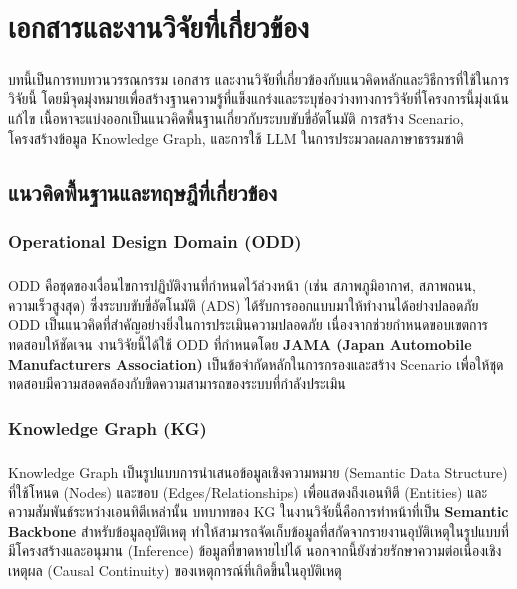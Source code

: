 \chapter{เอกสารและงานวิจัยที่เกี่ยวข้อง}

\paragraph{}
บทนี้เป็นการทบทวนวรรณกรรม เอกสาร และงานวิจัยที่เกี่ยวข้องกับแนวคิดหลักและวิธีการที่ใช้ในการวิจัยนี้ โดยมีจุดมุ่งหมายเพื่อสร้างฐานความรู้ที่แข็งแกร่งและระบุช่องว่างทางการวิจัยที่โครงการนี้มุ่งเน้นแก้ไข เนื้อหาจะแบ่งออกเป็นแนวคิดพื้นฐานเกี่ยวกับระบบขับขี่อัตโนมัติ การสร้าง Scenario, โครงสร้างข้อมูล Knowledge Graph, และการใช้ LLM ในการประมวลผลภาษาธรรมชาติ

\section{แนวคิดพื้นฐานและทฤษฎีที่เกี่ยวข้อง}

\subsection{Operational Design Domain (ODD)}
\paragraph{}
ODD คือชุดของเงื่อนไขการปฏิบัติงานที่กำหนดไว้ล่วงหน้า (เช่น สภาพภูมิอากาศ, สภาพถนน, ความเร็วสูงสุด) ซึ่งระบบขับขี่อัตโนมัติ (ADS) ได้รับการออกแบบมาให้ทำงานได้อย่างปลอดภัย ODD เป็นแนวคิดที่สำคัญอย่างยิ่งในการประเมินความปลอดภัย เนื่องจากช่วยกำหนดขอบเขตการทดสอบให้ชัดเจน งานวิจัยนี้ได้ใช้ ODD ที่กำหนดโดย \textbf{JAMA (Japan Automobile Manufacturers Association)} เป็นข้อจำกัดหลักในการกรองและสร้าง Scenario เพื่อให้ชุดทดสอบมีความสอดคล้องกับขีดความสามารถของระบบที่กำลังประเมิน

\subsection{Knowledge Graph (KG)}
\paragraph{}
Knowledge Graph เป็นรูปแบบการนำเสนอข้อมูลเชิงความหมาย (Semantic Data Structure) ที่ใช้โหนด (Nodes) และขอบ (Edges/Relationships) เพื่อแสดงถึงเอนทิตี (Entities) และความสัมพันธ์ระหว่างเอนทิตีเหล่านั้น บทบาทของ KG ในงานวิจัยนี้คือการทำหน้าที่เป็น \textbf{Semantic Backbone} สำหรับข้อมูลอุบัติเหตุ ทำให้สามารถจัดเก็บข้อมูลที่สกัดจากรายงานอุบัติเหตุในรูปแบบที่มีโครงสร้างและอนุมาน (Inference) ข้อมูลที่ขาดหายไปได้ นอกจากนี้ยังช่วยรักษาความต่อเนื่องเชิงเหตุผล (Causal Continuity) ของเหตุการณ์ที่เกิดขึ้นในอุบัติเหตุ

